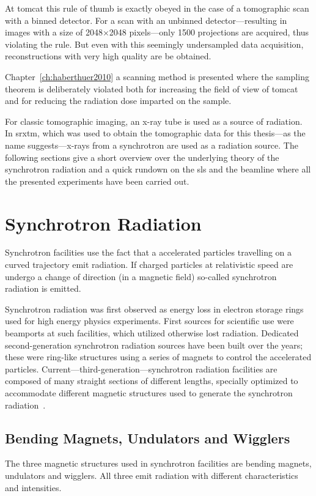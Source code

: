At \ac{tomcat} this rule of thumb is exactly obeyed in the case of a tomographic scan with a binned detector. For a scan with an unbinned detector---resulting in images with a size of 2048$\times$2048 pixels---only 1500 projections are acquired, thus violating the rule. But even with this seemingly undersampled data acquisition, reconstructions with very high quality are be obtained.

Chapter~\ref{ch:haberthuer2010} a scanning method is presented where the sampling theorem is deliberately violated both for increasing the field of view of \ac{tomcat} and for reducing the radiation dose imparted on the sample.

For classic tomographic imaging, an x-ray tube is used as a source of radiation. In \ac{srxtm}, which was used to obtain the tomographic data for this thesis---as the name suggests---x-rays from a synchrotron are used as a radiation source. The following sections give a short overview over the underlying theory of the synchrotron radiation and a quick rundown on the \ac{sls} and the beamline where all the presented experiments have been carried out.

\section{Synchrotron Radiation}
Synchrotron facilities use the fact that a accelerated particles travelling on a curved trajectory emit radiation. If charged particles at relativistic speed are undergo a change of direction (\ie in a magnetic field) so-called synchrotron radiation is emitted. 

Synchrotron radiation was first observed as energy loss in electron storage rings used for high energy physics experiments. First sources for scientific use were beamports at such facilities, which utilized otherwise lost radiation. Dedicated second-generation synchrotron radiation sources have been built over the years; these were ring-like structures using a series of magnets to control the accelerated particles. Current---third-generation---synchrotron radiation facilities are composed of many straight sections of different lengths, specially optimized to accommodate different magnetic structures used to generate the synchrotron radiation~\cite{Stampanoni2002a,Margaritondo2002,wwwsls}. 

\subsection{Bending Magnets, Undulators and Wigglers}
The three magnetic structures used in synchrotron facilities are bending magnets, undulators and wigglers. All three emit radiation with different characteristics and intensities.

